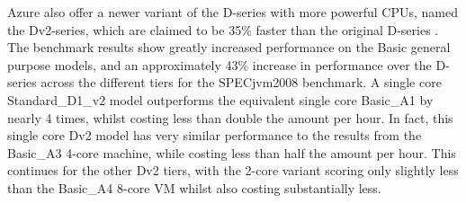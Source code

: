 \documentclass{llncs}
\begin{document}
\begin{table*}[!h]
\begin{adjustbox}{width=\linewidth,center}
  \end{adjustbox}
\end{table*}

Azure also offer a newer variant of the D-series with more powerful CPUs, named the Dv2-series, which are claimed to be 35\% faster than the original D-series \cite{azurevmtype}. The benchmark results show greatly increased performance on the Basic general purpose models, and an approximately 43\% increase in performance over the D-series across the different tiers for the SPECjvm2008 benchmark. A single core Standard\_D1\_v2 model outperforms the equivalent single core Basic\_A1 by nearly 4 times, whilst costing less than double the amount per hour. In fact, this single core Dv2 model has very similar performance to the results from the Basic\_A3 4-core machine, while costing less than half the amount per hour. This continues for the other Dv2 tiers, with the 2-core variant scoring only slightly less than the Basic\_A4 8-core VM whilst also costing substantially less.
\end{document}
